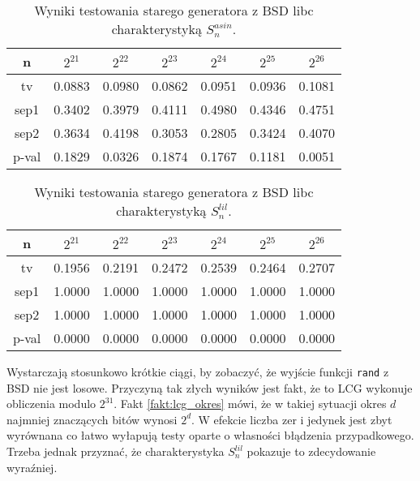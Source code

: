 \documentclass[a4paper,11pt,twoside]{book}
\newcommand{\Slil}[1]{S^{lil}_#1}
\newcommand{\Sasin}[1]{S^{asin}_#1}
\theoremstyle{definition}
\begin{document}
\begin{table}[ht!]
\centering
 \caption{Wyniki testowania starego generatora z BSD libc charakterystyką $\Sasin{n}$.}
 \label{tab:bsd_asin}
\begin{tabular} {||c|c|c|c|c|c|c||}  
 \hline 
      n &  $2^{21}$ &  $2^{22}$ &  $2^{23}$ &  $2^{24}$ &  $2^{25}$ &  $2^{26}$\\ \hline
     tv &  0.0883 &  0.0980 &  0.0862 &  0.0951 &  0.0936 &  0.1081\\ \hline
   sep1 &  0.3402 &  0.3979 &  0.4111 &  0.4980 &  0.4346 &  0.4751\\ \hline
   sep2 &  0.3634 &  0.4198 &  0.3053 &  0.2805 &  0.3424 &  0.4070\\ \hline
  p-val &  0.1829 &  0.0326 &  0.1874 &  0.1767 &  0.1181 &  0.0051\\ \hline

\end{tabular}  
\end{table}
\begin{table}[ht!]
\centering
 \caption{Wyniki testowania starego generatora z BSD libc charakterystyką $\Slil{n}$.}
 \label{tab:bsd_lil}
\begin{tabular} {||c|c|c|c|c|c|c||}  
 \hline 
      n &  $2^{21}$ &  $2^{22}$ &  $2^{23}$ &  $2^{24}$ &  $2^{25}$ &  $2^{26}$\\ \hline
     tv &  0.1956 &  0.2191 &  0.2472 &  0.2539 &  0.2464 &  0.2707\\ \hline
   sep1 &  1.0000 &  1.0000 &  1.0000 &  1.0000 &  1.0000 &  1.0000\\ \hline
   sep2 &  1.0000 &  1.0000 &  1.0000 &  1.0000 &  1.0000 &  1.0000\\ \hline
  p-val &  0.0000 &  0.0000 &  0.0000 &  0.0000 &  0.0000 &  0.0000\\ \hline
\end{tabular}  
\end{table}

Wystarczają stosunkowo krótkie ciągi, by zobaczyć, że wyjście funkcji \texttt{rand} z BSD nie jest losowe. Przyczyną tak złych wyników jest fakt, że to LCG wykonuje obliczenia modulo $2^{31}$. Fakt \ref{fakt:lcg_okres} mówi, że w takiej sytuacji okres $d$ najmniej znaczących bitów wynosi $2^d$. W efekcie liczba zer i jedynek jest zbyt wyrównana co łatwo wyłapują testy oparte o własności błądzenia przypadkowego. Trzeba jednak przyznać, że charakterystyka $\Slil{n}$ pokazuje to zdecydowanie wyraźniej.

\FloatBarrier
\end{document}
